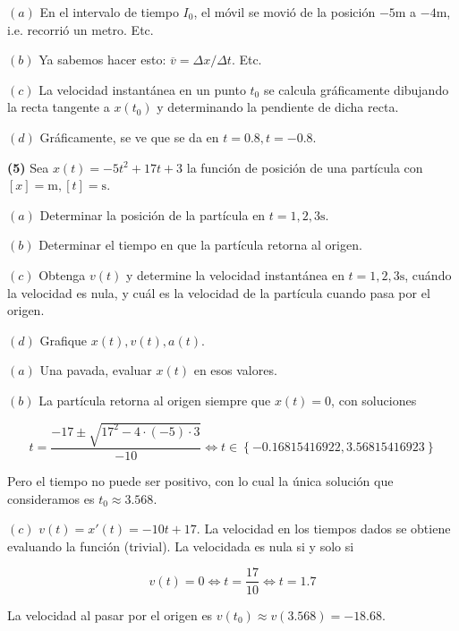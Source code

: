 \documentclass[12pt]{article}
\theoremstyle{definition}
\begin{document}
$(a)$ En el intervalo de tiempo $I_0$, el móvil se movió de la posición
$-5\text{m}$ a $-4\text{m}$, i.e. recorrió un metro. Etc. 

$(b)$ Ya sabemos hacer esto: $\overline{v} = \Delta x / \Delta t$. Etc. 

$(c)$ La velocidad instantánea en un punto $t_0$ se calcula gráficamente
dibujando la recta tangente a $x(t_0)$ y determinando la pendiente de dicha
recta. 

$(d)$ Gráficamente, se ve que se da en $t = 0.8, t = -0.8$.

\pagebreak 

\begin{shaded}
    \textbf{(5)} Sea $x(t) = -5t^2 + 17t + 3$ la función de posición de una
    partícula con $\left[ x \right] = \text{m}, \left[ t \right] = \text{s} $. 

    $(a)$ Determinar la posición de la partícula en $t =1,2,3\text{s}$.

    $(b)$ Determinar el tiempo en que la partícula retorna al origen.

    $(c)$ Obtenga $v(t)$ y determine la velocidad instantánea en
    $t=1,2,3\text{s}$, cuándo la velocidad es nula, y cuál es la velocidad de la
    partícula cuando pasa por el origen. 

    $(d)$ Grafique $x(t), v(t), a(t)$.
\end{shaded}

$(a)$ Una pavada, evaluar $x(t)$ en esos valores. 

$(b)$ La partícula retorna al origen siempre que $x(t) = 0$, con soluciones 

\begin{equation*}
    t = \frac{-17 \pm \sqrt{17^2 - 4 \cdot (-5) \cdot 3} }{-10} \iff t \in
    \left\{ -0.16815416922, 3.56815416923 \right\} 
\end{equation*}

Pero el tiempo no puede ser positivo, con lo cual la única solución que
consideramos es $t_0 \approx 3.568$.

$(c)$ $v(t) = x'(t) = -10t + 17$. La velocidad en los tiempos dados se obtiene
evaluando la función (trivial). La velocidada es nula si y solo si 

\begin{equation*}
    v(t) = 0 \iff t = \frac{17}{10} \iff t = 1.7
\end{equation*}

La velocidad al pasar por el origen es $v(t_0) \approx v(3.568) = -18.68$.
\end{document}
